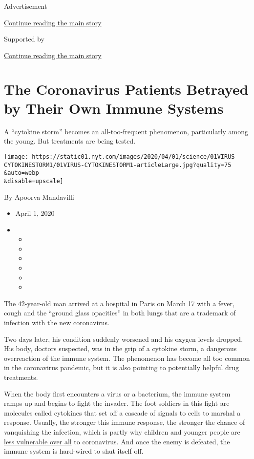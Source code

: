 Advertisement

\protect\hyperlink{after-top}{Continue reading the main story}

Supported by

\protect\hyperlink{after-sponsor}{Continue reading the main story}

\hypertarget{the-coronavirus-patients-betrayed-by-their-own-immune-systems}{%
\section{The Coronavirus Patients Betrayed by Their Own Immune
Systems}\label{the-coronavirus-patients-betrayed-by-their-own-immune-systems}}

A ``cytokine storm'' becomes an all-too-frequent phenomenon,
particularly among the young. But treatments are being tested.

\texttt{[image: https://static01.nyt.com/images/2020/04/01/science/01VIRUS-CYTOKINESTORM1/01VIRUS-CYTOKINESTORM1-articleLarge.jpg?quality=75\\\&auto=webp\\\&disable=upscale]}

By Apoorva Mandavilli

\begin{itemize}
\item
  April 1, 2020
\item
  \begin{itemize}
  \item
  \item
  \item
  \item
  \item
  \item
  \end{itemize}
\end{itemize}

The 42-year-old man arrived at a hospital in Paris on March 17 with a
fever, cough and the ``ground glass opacities'' in both lungs that are a
trademark of infection with the new coronavirus.

Two days later, his condition suddenly worsened and his oxygen levels
dropped. His body, doctors suspected, was in the grip of a cytokine
storm, a dangerous overreaction of the immune system. The phenomenon has
become all too common in the coronavirus pandemic, but it is also
pointing to potentially helpful drug treatments.

When the body first encounters a virus or a bacterium, the immune system
ramps up and begins to fight the invader. The foot soldiers in this
fight are molecules called cytokines that set off a cascade of signals
to cells to marshal a response. Usually, the stronger this immune
response, the stronger the chance of vanquishing the infection, which is
partly why children and younger people are
\href{https://www.nytimes.com/2020/02/05/health/coronavirus-children.html}{less
vulnerable over all} to coronavirus. And once the enemy is defeated, the
immune system is hard-wired to shut itself off.

